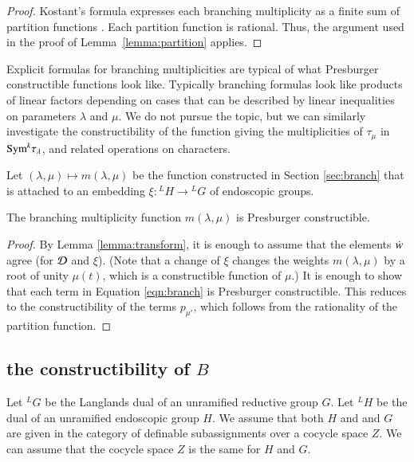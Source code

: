 \begin{proof}  
  Kostant's formula expresses each branching multiplicity as a finite
  sum of partition functions \cite[Theorem ~8.2.1]{goodman}.  Each
  partition function is rational.  Thus, the argument used in the
  proof of Lemma~\ref{lemma:partition} applies.
\end{proof}

Explicit formulas for branching multiplicities are typical of what
Presburger constructible functions look like.  Typically branching
formulas look like products of linear factors depending on cases that
can be described by linear inequalities on parameters $\lambda$ and
$\mu$.  We do not pursue the topic, but we can similarly investigate
the constructibility of the function giving the multiplicities of
$\tau_\mu$ in ${\operatorname{Sym}}^k \tau_\lambda$, and related operations on
characters.

\bigskip 

Let $(\lambda,\mu)\mapsto m(\lambda,\mu)$ be the function constructed
in Section \ref{sec:branch} that is attached to an embedding
$\xi:{}^LH\to {}^LG$ of endoscopic groups.

\begin{lemma}\label{lemma:branch} 
  The branching multiplicity function $m(\lambda,\mu)$ is Presburger
  constructible.
\end{lemma}

\begin{proof} 
  By Lemma \ref{lemma:transform}, it is enough to assume that the
  elements
  $\dot w$ agree (for $\mathcal D$ and $\xi$).  (Note that a change of $\xi$
  changes the weights $m(\lambda,\mu)$ by a root of unity $\mu(t)$,
  which is a constructible function of $\mu$.)
  It is enough to show that each term in Equation \ref{eqn:branch} is
  Presburger constructible.  This reduces to the constructibility of
  the terms $p_{\mu'}$, which follows from the rationality of the
  partition function.
\end{proof}


\subsection{the constructibility of $B$}\label{sec:B}

Let ${}^LG$ be the Langlands dual of an unramified reductive group
$G$.  Let ${}^LH$ be the dual of an unramified endoscopic group $H$.
We assume that both $H$ and and $G$ are given in the category of
definable subassignments over a cocycle space $Z$.  We can assume that
the cocycle space $Z$ is the same for $H$ and $G$.

